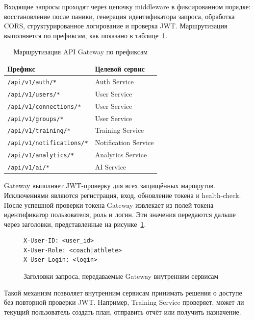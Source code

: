 Входящие запросы проходят через цепочку middleware в фиксированном порядке: восстановление после паники, генерация идентификатора запроса, обработка CORS, структурированное логирование и проверка JWT. Маршрутизация выполняется по префиксам, как показано в таблице~\ref{tab:gateway-routing}.

\begin{longtable}{|>{\raggedright\arraybackslash}p{}|>{\raggedright\arraybackslash}p{}|}
\caption{Маршрутизация API Gateway по префиксам}\label{tab:gateway-routing}\\
\hline
Префикс & Целевой сервис \\
\hline
\endhead
\hline
\endlastfoot
\passthrough{\lstinline!/api/v1/auth/*!} & Auth Service \\ \hline
\passthrough{\lstinline!/api/v1/users/*!} & User Service \\ \hline
\passthrough{\lstinline!/api/v1/connections/*!} & User Service \\ \hline
\passthrough{\lstinline!/api/v1/groups/*!} & User Service \\ \hline
\passthrough{\lstinline!/api/v1/training/*!} & Training Service \\ \hline
\passthrough{\lstinline!/api/v1/notifications/*!} & Notification Service \\ \hline
\passthrough{\lstinline!/api/v1/analytics/*!} & Analytics Service \\ \hline
\passthrough{\lstinline!/api/v1/ai/*!} & AI Service \\ \hline
\end{longtable}

Gateway выполняет JWT-проверку для всех защищённых маршрутов. Исключениями являются регистрация, вход, обновление токена и health-check. После успешной проверки токена Gateway извлекает из полей токена идентификатор пользователя, роль и логин. Эти значения передаются дальше через заголовки, представленные на рисунке~\ref{src:gateway-headers}.

\begin{figure}
\begin{lstlisting}
X-User-ID: <user_id>
X-User-Role: <coach|athlete>
X-User-Login: <login>
\end{lstlisting}
\caption{Заголовки запроса, передаваемые Gateway внутренним сервисам}
\label{src:gateway-headers}
\end{figure}

Такой механизм позволяет внутренним сервисам принимать решения о доступе без повторной проверки JWT. Например, Training Service проверяет, может ли текущий пользователь создать план, отправить отчёт или получить назначение.

